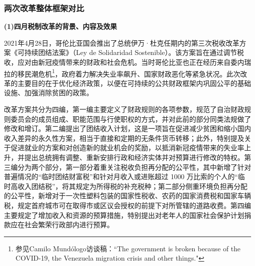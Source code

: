 \documentclass{phyasgn}\usepackage{nag}
\begin{document}
\subsubsection{两次改革整体框架对比}
\textbf{(1)四月税制改革的背景、内容及效果}
\par 2021年4月28日，哥伦比亚国会推出了总统伊万·杜克任期内的第三次税收改革方案《可持续团结法案》（Ley de Solidaridad Sostenible）。该方案旨在通过调节税收，应对由新冠疫情带来的财政和社会危机。当时哥伦比亚也正在经历来自委内瑞拉的移民潮危机\footnote[14]{参见Camilo Mundólogo访谈稿：“The government is broken because of the COVID-19, the Venezuela migration crisis and other things."}，政府着力解决失业率飙升、国家财政恶化等紧急状况。此次改革的主要目的在于优化经济政策，以便在可持续的公共财政框架内巩固公平的基础设施、加强消除贫困的政策。
\par 改革方案共分为四编，第一编主要定义了财政规则的各项参数，规范了自治财政规则委员会的成员组成、职能范围与行使职权的方式，并对此前的部分同类法规做了修改和增订。第二编提出了团结收入计划，这是一项旨在促进减少贫困和缩小国内收入差异的永久性方案，相当于直接和定期的无条件货币转移；此外，特别提及关于促进就业的方案和对创造新的就业机会的奖励，以抵消新冠疫情带来的失业率上升，并提出总统拥有调整、重新安排行政和经济实体并对预算进行修改的特权。第三编分为两个部分，第一部分着重关注税收负担再分配的公平性，其中新增了针对普遍情况的“临时团结财富税”和针对月收入或进账超过 1000 万比索的个人的“临时高收入团结税”，将其规定为所得税的补充税种；第二部分侧重环境负担再分配的公平性，新增对于一次性塑料包装的国家性税收、农药的国家消费税和国家车辆税，规定首府城市可在取得市或区议会授权的前提下对所管辖的道路收费。第四编主要规定了增加收入和资源的预算措施，特别提出对老年人的国家社会保护计划捐款应在社会繁荣行政部内进行预算。
\end{document}
